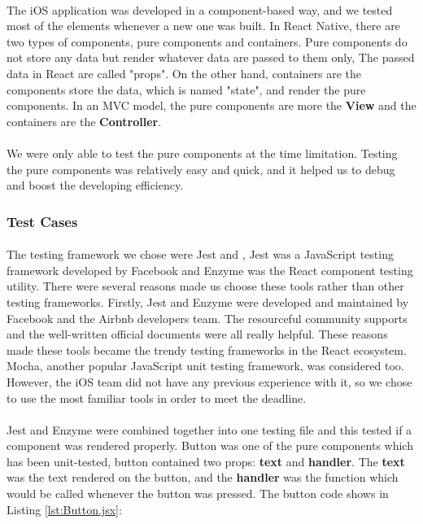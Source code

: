 \documentclass[12pt,a4paper]{article}
\begin{document}
          \paragraph{}The iOS application was developed in a component-based way, and we tested most of the elements whenever a new one was built. In React Native, there are two types of components, pure components and containers. Pure components do not store any data but render whatever data are passed to them only, The passed data in React are called "props". On the other hand, containers are the components store the data, which is named "state", and render the pure components. In an MVC model, the pure components are more the {\bf View} and the containers are the {\bf Controller}.
          
          \paragraph{}We were only able to test the pure components at the time limitation. Testing the pure components was relatively easy and quick, and it helped us to debug and boost the developing efficiency.

        \subsubsection{Test Cases} %
          \paragraph{}The testing framework we chose were Jest\cite{Jest} and \cite{Enzyme}, Jest was a JavaScript testing framework developed by Facebook and Enzyme was the React component testing utility. There were several reasons made us choose these tools rather than other testing frameworks. Firstly, Jest and Enzyme were developed and maintained by Facebook and the Airbnb developers team. The resourceful community supports and the well-written official documents were all really helpful. These reasons made these tools became the trendy testing frameworks in the React ecosystem. Mocha, another popular JavaScript unit testing framework, was considered too. However, the iOS team did not have any previous experience with it, so we chose to use the most familiar tools in order to meet the deadline.
          
          \paragraph{}Jest and Enzyme were combined together into one testing file and this tested if a component was rendered properly. Button was one of the pure components which has been unit-tested, button contained two props: {\bf text} and {\bf handler}. The {\bf text} was the text rendered on the button, and the {\bf handler} was the function which would be called whenever the button was pressed. The button code shows in Listing \ref{lst:Button.jsx}:
        
\end{document}
